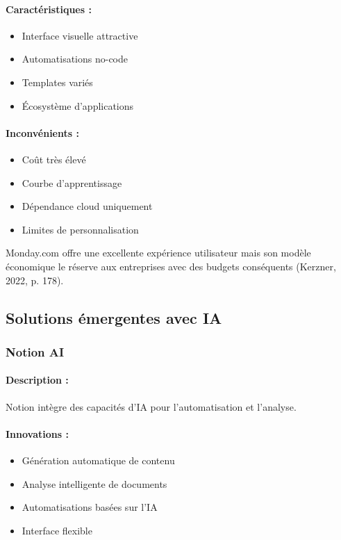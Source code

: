 \paragraph{Caractéristiques :}
\begin{itemize}
    \item Interface visuelle attractive
    \item Automatisations no-code
    \item Templates variés
    \item Écosystème d'applications
\end{itemize}

\paragraph{Inconvénients :}
\begin{itemize}
    \item Coût très élevé
    \item Courbe d'apprentissage
    \item Dépendance cloud uniquement
    \item Limites de personnalisation
\end{itemize}

Monday.com offre une excellente expérience utilisateur mais son modèle économique le réserve aux entreprises avec des budgets conséquents (Kerzner, 2022, p. 178).

\subsection{Solutions émergentes avec IA}

\subsubsection{Notion AI}
\paragraph{Description :} Notion intègre des capacités d'IA pour l'automatisation et l'analyse.

\paragraph{Innovations :}
\begin{itemize}
    \item Génération automatique de contenu
    \item Analyse intelligente de documents
    \item Automatisations basées sur l'IA
    \item Interface flexible
\end{itemize}

